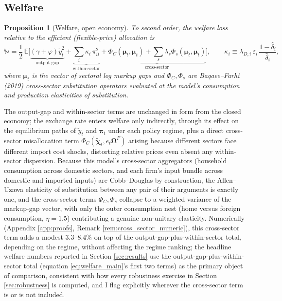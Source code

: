 \documentclass[12pt]{article}
\newtheorem{proposition}{Proposition}
\begin{document}
\subsection{Welfare}

\begin{proposition}[Welfare, open economy]
\label{prop:welfare}
To second order, the welfare loss relative to the efficient (flexible-price) allocation is
\begin{equation}
    \mathbb W = \frac12\,\mathbb E\Big[\underbrace{(\gamma+\varphi)\tilde y_t^2}_{\text{output gap}}
    + \underbrace{\sum_i\kappa_i\,\pi_{it}^2}_{\text{within-sector}}
    + \underbrace{\Phi_C(\bm\mu_t,\bm\mu_t)+\sum_s\lambda_s\Phi_s(\bm\mu_t,\bm\mu_t)}_{\text{cross-sector}}\Big],
    \qquad \kappa_i \equiv \lambda_{D,i}\,\varepsilon_i\,\frac{1-\hat\delta_i}{\hat\delta_i},
    \label{eq:welfare_main}
\end{equation}
where $\bm\mu_t$ is the vector of sectoral log markup gaps and $\Phi_C,\Phi_s$ are Baqaee--Farhi
(2019) cross-sector substitution operators evaluated at the model's consumption and production
elasticities of substitution.
\end{proposition}

The output-gap and within-sector terms are unchanged in form from the closed economy; the exchange
rate enters welfare only indirectly, through its effect on the equilibrium paths of $\tilde y_t$ and
$\bm\pi_t$ under each policy regime, plus a direct cross-sector misallocation term
$\Phi_C(\tilde{\bm\chi}_t, e_t\bm\Omega^F)$ arising because different sectors face different import
cost shocks, distorting relative prices even absent any within-sector dispersion. Because this
model's cross-sector aggregators (household consumption across domestic sectors, and each firm's
input bundle across domestic and imported inputs) are Cobb--Douglas by construction, the Allen--Uzawa
elasticity of substitution between any pair of their arguments is exactly one, and the cross-sector
terms $\Phi_C,\Phi_s$ collapse to a weighted variance of the markup-gap vector, with only the outer
consumption nest (home versus foreign consumption, $\eta=1.5$) contributing a genuine
non-unitary elasticity. Numerically (Appendix \ref{app:proofs}, Remark \ref{rem:cross_sector_numeric}),
this cross-sector term adds a modest 3.3--8.4\% on top of the output-gap-plus-within-sector total,
depending on the regime, without affecting the regime ranking; the headline welfare numbers reported
in Section \ref{sec:results} use the output-gap-plus-within-sector total (equation
\eqref{eq:welfare_main}'s first two terms) as the primary object of comparison, consistent with how
every robustness exercise in Section \ref{sec:robustness} is computed, and I flag explicitly wherever
the cross-sector term is or is not included.
\end{document}
